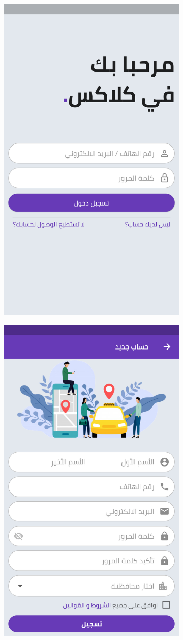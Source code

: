  \begin{figure}[H] 
 \begin{subfigure}[b]{0.5\linewidth}
    \centering
    \includegraphics[width=0.5\linewidth]{images/ch3/login/0.png}
  
  \end{subfigure}%
    \begin{subfigure}[b]{0.5\linewidth}
    \centering
    \includegraphics[width=0.5\linewidth]{images/ch3/login/1.png}
  

\end{subfigure}
\end{figure}
